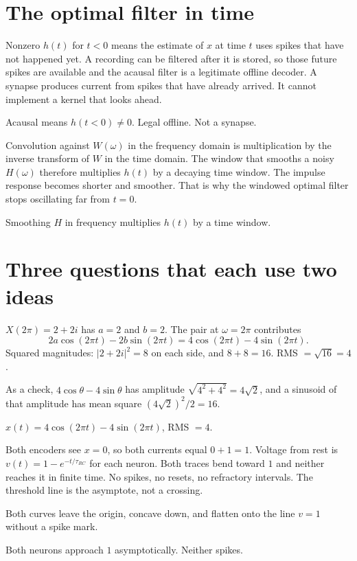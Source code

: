 \documentclass[11pt,letterpaper]{article}
\newcommand{\trc}{\tau_{RC}}
\newcommand{\ans}[1]{\par\vspace{2pt}{\bfseries #1}\quad}
\begin{document}
\section{The optimal filter in time}

\ans{1.}
Nonzero $h(t)$ for $t < 0$ means the estimate of $x$ at time $t$ uses spikes that have not happened yet. A recording can be filtered after it is stored, so those future spikes are available and the acausal filter is a legitimate offline decoder. A synapse produces current from spikes that have already arrived. It cannot implement a kernel that looks ahead.
\begin{result}
Acausal means $h(t < 0) \ne 0$. Legal offline. Not a synapse.
\end{result}

\ans{2.}
Convolution against $W(\omega)$ in the frequency domain is multiplication by the inverse transform of $W$ in the time domain. The window that smooths a noisy $H(\omega)$ therefore multiplies $h(t)$ by a decaying time window. The impulse response becomes shorter and smoother. That is why the windowed optimal filter stops oscillating far from $t = 0$.
\begin{result}
Smoothing $H$ in frequency multiplies $h(t)$ by a time window.
\end{result}

\section{Three questions that each use two ideas}

\ans{1.}
$X(2\pi) = 2 + 2i$ has $a = 2$ and $b = 2$. The pair at $\omega = 2\pi$ contributes
\[
2a\cos(2\pi t) - 2b\sin(2\pi t) = 4\cos(2\pi t) - 4\sin(2\pi t).
\]
Squared magnitudes: $|2+2i|^2 = 8$ on each side, and $8 + 8 = 16$. RMS $= \sqrt{16} = 4$.

As a check, $4\cos\theta - 4\sin\theta$ has amplitude $\sqrt{4^2 + 4^2} = 4\sqrt{2}$, and a sinusoid of that amplitude has mean square $(4\sqrt{2})^2/2 = 16$.
\begin{result}
$x(t) = 4\cos(2\pi t) - 4\sin(2\pi t)$, RMS $= 4$.
\end{result}

\ans{2.}
Both encoders see $x = 0$, so both currents equal $0 + 1 = 1$. Voltage from rest is $v(t) = 1 - e^{-t/\trc}$ for each neuron. Both traces bend toward $1$ and neither reaches it in finite time. No spikes, no resets, no refractory intervals. The threshold line is the asymptote, not a crossing.
\begin{sketch}
Both curves leave the origin, concave down, and flatten onto the line $v = 1$ without a spike mark.
\end{sketch}
\begin{result}
Both neurons approach $1$ asymptotically. Neither spikes.
\end{result}
\end{document}
